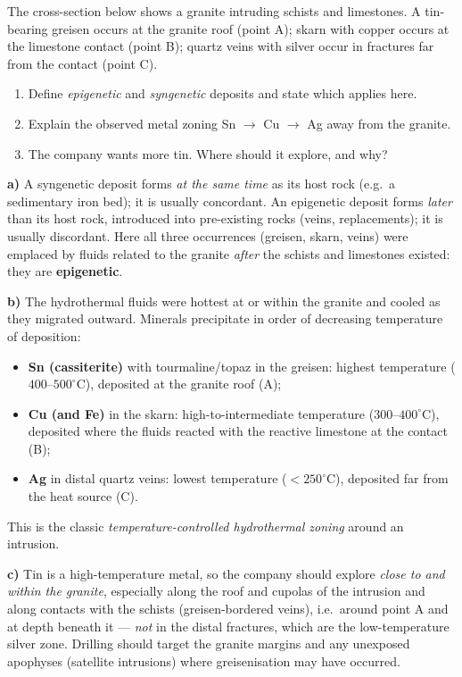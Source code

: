 \documentclass[11pt]{article}
\newcommand{\cle}[1]{{\popxbold\color{popdark}#1}}
\begin{document}
\begin{exoresolu}
The cross-section below shows a granite intruding schists and limestones. A tin-bearing greisen occurs at the granite roof (point A); skarn with copper occurs at the limestone contact (point B); quartz veins with silver occur in fractures far from the contact (point C).
\begin{enumerate}
\item[a)] Define \emph{epigenetic} and \emph{syngenetic} deposits and state which applies here.
\item[b)] Explain the observed metal zoning Sn $\rightarrow$ Cu $\rightarrow$ Ag away from the granite.
\item[c)] The company wants more tin. Where should it explore, and why?
\end{enumerate}
\tcblower
\textbf{a)} A \cle{syngenetic} deposit forms \emph{at the same time} as its host rock (e.g.\ a sedimentary iron bed); it is usually concordant. An \cle{epigenetic} deposit forms \emph{later} than its host rock, introduced into pre-existing rocks (veins, replacements); it is usually discordant. Here all three occurrences (greisen, skarn, veins) were emplaced by fluids related to the granite \emph{after} the schists and limestones existed: they are \textbf{epigenetic}.

\textbf{b)} The hydrothermal fluids were hottest at or within the granite and cooled as they migrated outward. Minerals precipitate in order of decreasing temperature of deposition:
\begin{itemize}
\item \textbf{Sn (cassiterite)} with tourmaline/topaz in the greisen: highest temperature ($400$--$500^\circ\mathrm{C}$), deposited at the granite roof (A);
\item \textbf{Cu (and Fe)} in the skarn: high-to-intermediate temperature ($300$--$400^\circ\mathrm{C}$), deposited where the fluids reacted with the reactive limestone at the contact (B);
\item \textbf{Ag} in distal quartz veins: lowest temperature ($<250^\circ\mathrm{C}$), deposited far from the heat source (C).
\end{itemize}
This is the classic \emph{temperature-controlled hydrothermal zoning} around an intrusion.

\textbf{c)} Tin is a high-temperature metal, so the company should explore \emph{close to and within the granite}, especially along the roof and cupolas of the intrusion and along contacts with the schists (greisen-bordered veins), i.e.\ around point A and at depth beneath it — \emph{not} in the distal fractures, which are the low-temperature silver zone. Drilling should target the granite margins and any unexposed apophyses (satellite intrusions) where greisenisation may have occurred.
\end{exoresolu}
\end{document}

